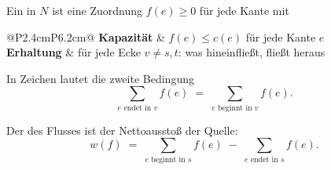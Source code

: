 \begin{definition}
Ein  in $N$ ist eine Zuordnung $f(e) \ge 0$ für jede Kante mit
\begin{center}
\renewcommand{\arraystretch}{1.5}
\begin{tabular}{@{}P{2.4cm}P{6.2cm}@{}}
\toprule
\textbf{Kapazität} & $f(e) \le c(e)$ für jede Kante $e$\\
\textbf{Erhaltung} & für jede Ecke $v \neq s,t$: was hineinfließt, fließt heraus\\
\bottomrule
\end{tabular}
\end{center}
In Zeichen lautet die zweite Bedingung
\[ \sum_{e \text{ endet in } v} f(e) \;=\; \sum_{e \text{ beginnt in } v} f(e) . \]

Der  des Flusses ist der Nettoausstoß der Quelle:
\[ w(f) \;=\; \sum_{e \text{ beginnt in } s} f(e) \;-\; \sum_{e \text{ endet in } s} f(e) . \]
\end{definition}

